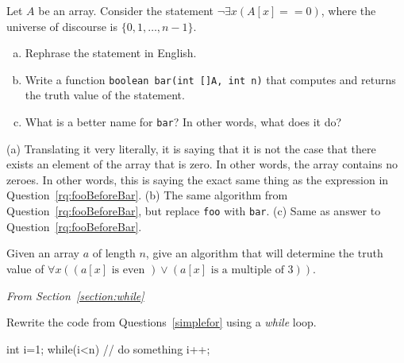 \begin{requ}
Let $A$ be an array. Consider the statement $\neg \exists x (A[x]==0)$,
where the universe of discourse is $\{0,1,\ldots, n-1\}$.
\begin{enumerate}[(a)]
\item
Rephrase the statement in English.
\item
Write a function \verb+boolean bar(int []A, int n)+ 
that computes and returns the truth value of the statement.
\item
What is a better name for \verb+bar+? In other words, what does it do?
\end{enumerate}
\begin{requanswer}
(a) Translating it very literally, it is saying that it is not the case that there exists an element of the array that is zero.
In other words, the array contains no zeroes. In other words, this is saying the exact same thing as the expression 
in Question~\ref{rq:fooBeforeBar}.
(b) The same algorithm from Question~\ref{rq:fooBeforeBar}, but replace \verb+foo+ with \verb+bar+.
(c) Same as answer to Question~\ref{rq:fooBeforeBar}.
\end{requanswer}
\end{requ}

\begin{requ}
Given an array $a$ of length $n$, give an algorithm that will determine the truth value of
$\forall x ( (a[x]\mbox{ is even }) \vee (a[x] \mbox{ is a multiple of 3}) )$.
\begin{requanswer}
\end{requanswer}
\end{requ}

\medskip 

\noindent
{\em From Section~\ref{section:while}}
\begin{requ}
Rewrite the code from Questions~\ref{simplefor} using a {\em while} loop.
\begin{requanswer}
\begin{code}
int i=1;
while(i<n) {
    // do something
    i++;
}
\end{code}
\end{requanswer}
\end{requ}

